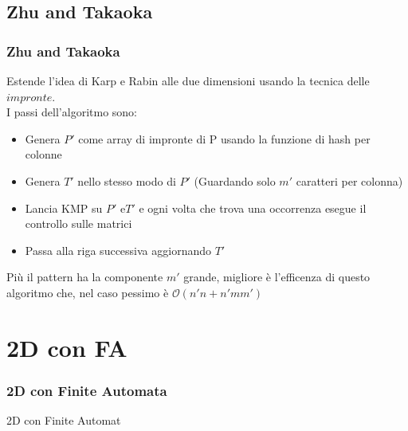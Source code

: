 \documentclass{beamer}
\newcommand{\bigO}{\ensuremath{\mathcal{O}}} %
\begin{document}
\subsection{Zhu and Takaoka}
\begin{frame}
\frametitle{Zhu and Takaoka}

Estende l'idea di Karp e Rabin alle due dimensioni usando la tecnica delle $impronte$.\\
I passi dell'algoritmo sono:
\begin{itemize}
\item Genera $P'$ come array di impronte di P usando la funzione di hash per colonne
\item Genera $T'$ nello stesso modo di $P'$ (Guardando solo $m'$ caratteri per colonna)
\item Lancia KMP su $P'$ e$T'$ e ogni volta che trova una occorrenza esegue il controllo sulle matrici
\item Passa alla riga successiva aggiornando $T'$
\end{itemize}

Più il pattern ha la componente $m'$ grande, migliore è l'efficenza di questo algoritmo che, nel caso pessimo è $\bigO{(n'n + n'mm')}$

\end{frame}


\section{2D con FA}

\begin{frame}
\frametitle{2D con Finite Automata}
\Huge{\centerline{2D con Finite Automat}}
\end{frame}
\end{document}
